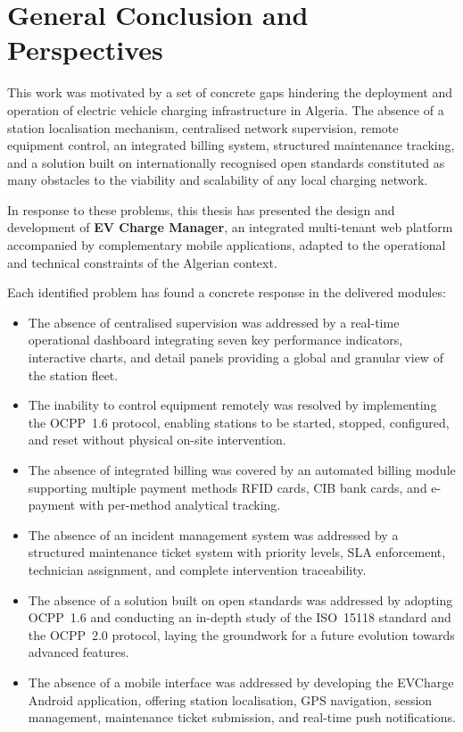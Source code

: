 \documentclass[12pt,a4paper]{report}
\begin{document}
\chapter*{General Conclusion and Perspectives}

This work was motivated by a set of concrete gaps hindering the deployment and operation of
electric vehicle charging infrastructure in Algeria. The absence of a station localisation
mechanism, centralised network supervision, remote equipment control, an integrated billing
system, structured maintenance tracking, and a solution built on internationally recognised
open standards constituted as many obstacles to the viability and scalability of any local
charging network.

In response to these problems, this thesis has presented the design and development of
\textbf{EV Charge Manager}, an integrated multi-tenant web platform accompanied by
complementary mobile applications, adapted to the operational and technical constraints of
the Algerian context.

Each identified problem has found a concrete response in the delivered modules:

\begin{itemize}
  \item The absence of centralised supervision was addressed by a real-time operational
        dashboard integrating seven key performance indicators, interactive charts, and detail
        panels providing a global and granular view of the station fleet.

  \item The inability to control equipment remotely was resolved by implementing the
        OCPP~1.6 protocol, enabling stations to be started, stopped, configured, and reset
        without physical on-site intervention.

  \item The absence of integrated billing was covered by an automated billing module
        supporting multiple payment methods RFID cards, CIB bank cards, and e-payment
        with per-method analytical tracking.

  \item The absence of an incident management system was addressed by a structured
        maintenance ticket system with priority levels, SLA enforcement, technician
        assignment, and complete intervention traceability.

  \item The absence of a solution built on open standards was addressed by adopting
        OCPP~1.6 and conducting an in-depth study of the ISO~15118 standard and the
        OCPP~2.0 protocol, laying the groundwork for a future evolution towards advanced
        features.

  \item The absence of a mobile interface was addressed by developing the EVCharge Android
        application, offering station localisation, GPS navigation, session management,
        maintenance ticket submission, and real-time push notifications.
\end{itemize}
\end{document}
